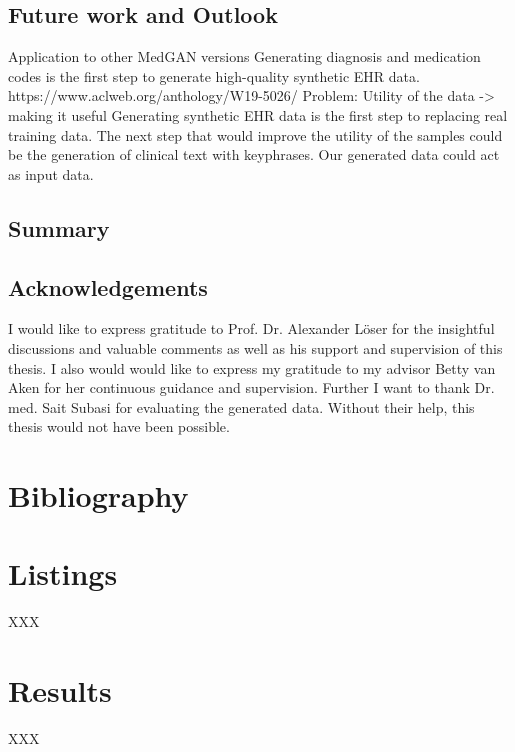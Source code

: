 \documentclass[11pt, a4paper, oneside]{book}
\begin{document}
\section{Future work and Outlook}
Application to other MedGAN versions
Generating diagnosis and medication codes is the first step to generate high-quality synthetic EHR data. 
https://www.aclweb.org/anthology/W19-5026/
Problem: Utility of the data -> making it useful
Generating synthetic EHR data is the first step to replacing real training data. The next step  that would improve the utility of the samples could be the generation of clinical text with keyphrases. Our generated data could act as input data.

\section{Summary}


\clearpage\newpage
{}
%



\newpage

\section*{Acknowledgements}
I would like to express gratitude to Prof. Dr. Alexander Löser for the insightful discussions and valuable comments as well as his support and supervision of this thesis. I also would would like to express my gratitude to my advisor Betty van Aken for her continuous guidance and supervision. Further I want to thank Dr. med. Sait Subasi for evaluating the generated data. Without their help, this thesis would not have been possible.


\appendix
\renewcommand\chaptername{Appendix}

\chapter{Bibliography}

\chapter{Listings}
XXX

\chapter{Results} 
XXX
\end{document}
